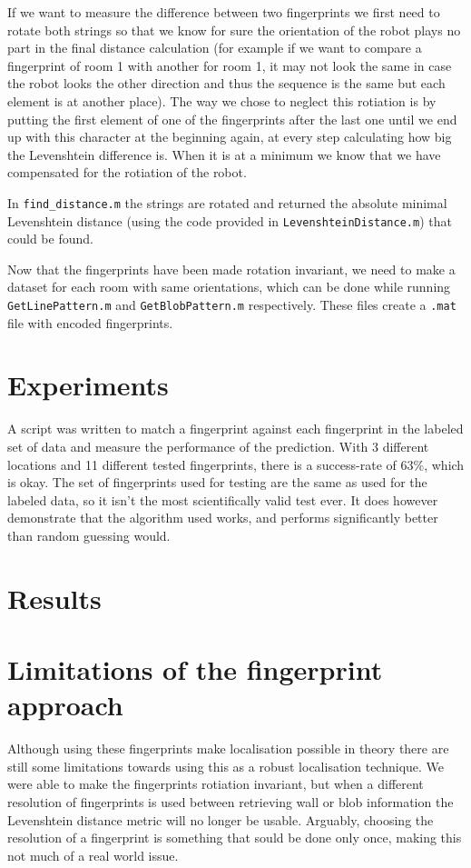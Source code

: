 \documentclass[a4paper, 20pt]{article}
\begin{document}
If we want to measure the difference between two fingerprints we first need to
rotate both strings so that we know for sure the orientation of the robot plays
no part in the final distance calculation (for example if we want to compare a
fingerprint of room 1 with another for room 1, it may not look the same in case
the robot looks the other direction and thus the sequence is the same but each
element is at another place). The way we chose to neglect this rotiation is by
putting the first element of one of the fingerprints after the last one until we
end up with this character at the beginning again, at every step calculating how
big the Levenshtein difference is. When it is at a minimum we know that we have
compensated for the rotiation of the robot.

In \texttt{find\_distance.m} the strings are rotated and returned the absolute minimal
Levenshtein distance (using the code provided in \texttt{LevenshteinDistance.m}) that could be found.

Now that the fingerprints have been made rotation invariant, we need to make a
dataset for each room with same orientations, which can be done while running
\texttt{GetLinePattern.m} and \texttt{GetBlobPattern.m} respectively. These
files create a \texttt{.mat} file with encoded fingerprints.



\section{Experiments}
A script was written to match a fingerprint against each fingerprint in the
labeled set of data and measure the performance of the prediction. With 3
different locations and 11 different tested fingerprints, there is a
success-rate of 63\%, which is okay. The set of fingerprints used for testing
are the same as used for the labeled data, so it isn't the most scientifically
valid test ever. It does however demonstrate that the algorithm used works, and
performs significantly better than random guessing would.


\section{Results}

\section{Limitations of the fingerprint approach}
Although using these fingerprints make localisation possible in theory there are
still some limitations towards using this as a robust localisation technique. We
were able to make the fingerprints rotiation invariant, but when a different
resolution of fingerprints is used between retrieving wall or blob information
the Levenshtein distance metric will no longer be usable. Arguably, choosing the
resolution of a fingerprint is something that sould be done only once, making
this not much of a real world issue.
\end{document}
